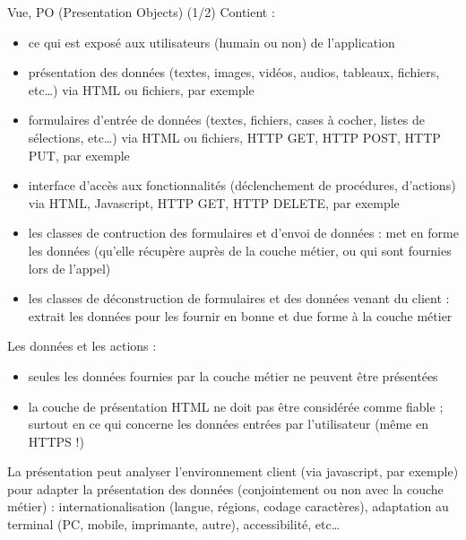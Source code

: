 \begin{frame}[containsverbatim]{Vue, PO (Presentation Objects) (1/2)}
	Contient :
	\begin{itemize}
		\item ce qui est exposé aux utilisateurs (humain ou non) de l'application
		\item présentation des données (textes, images, vidéos, audios, tableaux, fichiers, etc\ldots) via HTML ou fichiers, par exemple
		\item formulaires d'entrée de données (textes, fichiers, cases à cocher, listes de sélections, etc\ldots) via HTML ou fichiers, HTTP GET, HTTP POST, HTTP PUT, par exemple
		\item interface d'accès aux fonctionnalités (déclenchement de procédures, d'actions) via HTML, Javascript, HTTP GET, HTTP DELETE, par exemple
		\item les classes de contruction des formulaires et d'envoi de données : met en forme les données (qu'elle récupère auprès de la couche métier, ou qui sont fournies lors de l'appel)
		\item les classes de \og déconstruction \fg{} de formulaires et des données venant du client : extrait les données pour les fournir en bonne et due forme à la couche métier
	\end{itemize}
	Les données et les actions :
	\begin{itemize}
		\item seules les données fournies par la couche métier ne peuvent être présentées
		\item la couche de présentation HTML ne doit pas être considérée comme fiable ; surtout en ce qui concerne les données entrées par l'utilisateur (même en HTTPS !) 
	\end{itemize}
	La présentation peut analyser l'environnement client (via javascript, par exemple) pour adapter la présentation des données (conjointement ou non avec la couche métier) : internationalisation (langue, régions, codage caractères), adaptation au terminal (PC, mobile, imprimante, autre), accessibilité, etc\ldots
\end{frame}

